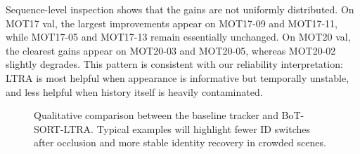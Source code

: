 Sequence-level inspection shows that the gains are not uniformly distributed. On MOT17 val, the largest improvements appear on MOT17-09 and MOT17-11, while MOT17-05 and MOT17-13 remain essentially unchanged. On MOT20 val, the clearest gains appear on MOT20-03 and MOT20-05, whereas MOT20-02 slightly degrades. This pattern is consistent with our reliability interpretation: LTRA is most helpful when appearance is informative but temporally unstable, and less helpful when history itself is heavily contaminated.

\begin{figure}[t]
\centering
{}
\caption{Qualitative comparison between the baseline tracker and BoT-SORT-LTRA. Typical examples will highlight fewer ID switches after occlusion and more stable identity recovery in crowded scenes.}
\label{fig:qual}
\end{figure}
